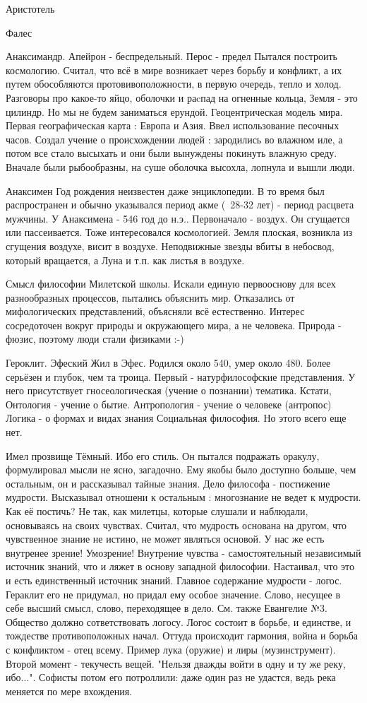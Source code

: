 Аристотель

Фалес

Анаксимандр.
Апейрон - беспредельный. Перос - предел
Пытался построить космологию. Считал, что всё в мире возникает через борьбу и конфликт, а их путем обособляются протовивоположности, в первую очередь, тепло и холод. 
Разговоры про какое-то яйцо, оболочки и раcпад на огненные кольца, Земля - это цилиндр. 
Но мы не будем заниматься ерундой. 
Геоцентрическая модель мира. Первая географическая карта : Европа и Азия. Ввел использование песочных часов. 
Создал учение о происхождении людей : зародились во влажном иле, а потом все стало высыхать и они были вынуждены покинуть влажную среду. Вначале были рыбообразны, на суше оболочка высохла, лопнула и вышли люди.

Анаксимен
Год рождения неизвестен даже энциклопедии. 
В то время был распространен и обычно указывался период акме (~28-32 лет) - период расцвета мужчины. 
У Анаксимена - 546 год до н.э..
Первоначало - воздух. Он сгущается или пассеивается. 
Тоже интересовался космологией. Земля плоская, возникла из сгущения воздухе, висит в воздухе. 
Неподвижные звезды вбиты в небосвод, который вращается, а Луна и т.п. как листья в воздухе.

Смысл философии Милетской школы. 
Искали единую первооснову для всех разнообразных процессов, пытались объяснить мир. 
Отказались от мифологических представлений, объясняли всё естественно. 
Интерес сосредоточен вокруг природы и окружающего мира, а не человека. Природа - фюзис, поэтому люди стали физиками :-)

Героклит. Эфеский
Жил в Эфес. Родился около 540, умер около 480. Более серьёзен и глубок, чем та троица. 
Первый - натурфилософские представления. У него присутствует гносеологическая (учение о познании) тематика. 
Кстати,
Онтология - учение о бытие.
Антропология - учение о человеке (антропос)
Логика - о формах и видах знания
Социальная философия. Но этого всего еще нет.

Имел прозвище Тёмный. Ибо его стиль. Он пытался подражать оракулу, формулировал мысли не ясно, загадочно. 
Ему якобы было доступно больше, чем остальным, он и рассказывал тайные знания.
Дело философа - постижение мудрости. Высказывал отношени к остальным : многознание не ведет к мудрости. Как её постичь? 
Не так, как милетцы, которые слушали и наблюдали, основываясь на своих чувствах. Считал, что мудрость основана на другом, что чувственное знание не истино, не может являться основой. 
У нас же есть внутренее зрение! Умозрение! Внутрение чувства - самостоятельный независимый источник знаний, что и ляжет в основу западной философии. Настаивал, что это и есть единственный источник знаний.
Главное содержание мудрости - логос. Гераклит его не придумал, но придал ему особое значение. Слово, несущее в себе высший смысл, слово, переходящее в дело. См. также Евангелие №3.
Общество должно сответствовать логосу. Логос состоит в борьбе, и единстве, и тождестве противоположных начал. Оттуда происходит гармония, война и борьба с конфликтом - отец всему. 
Пример лука (оружие) и лиры (музинструмент). Второй момент - текучесть вещей. "Нельзя дважды войти в одну и ту же реку, ибо...". Софисты потом его потроллили: даже один раз не удастся, ведь река меняется по мере вхождения.

